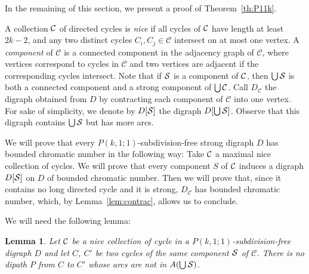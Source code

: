 \documentclass[utf8,10pt]{article}
\theoremstyle{plain}
\newtheorem{lemma}[theorem]{Lemma}
\theoremstyle{definition}
\theoremstyle{remark}
\begin{document}
\medskip

In the remaining of this section, we present a proof of Theorem~\ref{th:P11k}.

A collection ${\cal C}$ of directed cycles is {\it nice} if all cycles of ${\cal C}$ have length at least $2k-2$, and
any two distinct cycles $C_i,C_j\in\mathcal C$ intersect on at most one vertex. %
A {\it component} of $\mathcal{C}$ is a connected component in the adjacency graph of $\mathcal{C}$, where vertices correspond to cycles in $\mathcal{C}$
and two vertices are adjacent if the corresponding cycles intersect. Note that if ${\cal S}$ is a component of ${\cal C}$, then $\bigcup{\cal S}$ is 
both a connected component and a strong component of $\bigcup{\cal C}$.
Call $D_{\mathcal{C}}$ the digraph obtained from $D$ by contracting each component of $\mathcal{C}$ into one vertex. 
For sake of simplicity, we denote by $D[{\cal S}]$ the digraph $D[\bigcup {\cal S}]$. Observe that this digraph contains $\bigcup {\cal S}$ but has more arcs.


We will prove that every $P(k,1;1)$-subdivision-free strong digraph $D$ has bounded chromatic number in the following way:
Take ${\cal C}$ a maximal nice collection of cycles. 
We will prove that every component $S$ of ${\cal C}$ induces a digraph $D[{\cal S}]$ on $D$ of bounded chromatic number. 
Then we will prove that, since it contains no long directed cycle and it is strong, $D_{\mathcal{C}}$ has bounded chromatic number,
which, by Lemma~\ref{lem:contrac}, allows us to conclude. 

We will need the following lemma:



\begin{lemma}\label{lem:headphone}
Let ${\cal C}$ be a nice collection of cycle in a $P(k,1;1)$-subdivision-free digraph $D$ and let $C$, $C'$ be two cycles of the same
component ${\cal S}$ of $\mathcal{C}$. There is no dipath $P$ from $C$ to $C'$ whose arcs are not in $A (\bigcup  {\cal S})$. 
\end{lemma}
\end{document}
